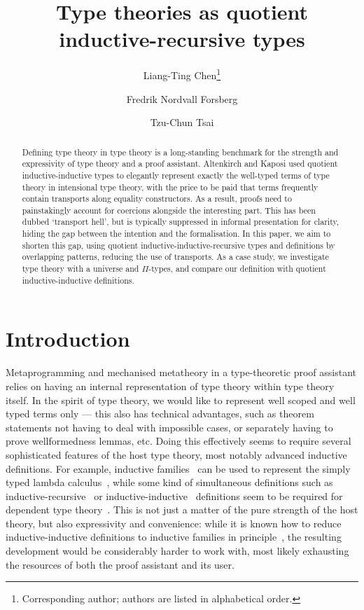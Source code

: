 \documentclass[a4paper,UKenglish,numberwithinsect,cleveref,thm-restate]{lipics-v2021}
\title{Type theories as quotient inductive-recursive types}
\author{Liang-Ting Chen\footnote{Corresponding author; authors are listed in alphabetical order.}}{Institute of Information Science, Academia Sinica, Taiwan \and \url{http://l-tchen.github.io}}{ltchen@iis.sinica.edu.tw}{https://orcid.org/0000-0002-3250-1331}{Supported by the National Science and Technology Council of Taiwan under grant NSTC 114-2222-E-001-001-MY3.}
\author{Fredrik Nordvall Forsberg}{Department of Computer and Information Sciences, University of Strathclyde, UK \and \url{https://fredriknf.com}}{fredrik.nordvall-forsberg@strath.ac.uk}{https://orcid.org/0000-0001-6157-9288}{Supported by the Engineering and Physical Sciences Research Council [EP/Y000455/1].}
\author{Tzu-Chun Tsai}{Institute of Information Science, Academia Sinica, Taiwan}{gene0905@icloud.com}{}{Supported by the National Science and Technology Council of Taiwan under grant NSTC 112-2221-E-001-003-MY3.}
\begin{document}
\maketitle

\begin{abstract}
  Defining type theory in type theory is a long-standing benchmark for the strength and expressivity of type theory and a proof assistant.
  Altenkirch and Kaposi used quotient inductive-inductive types to elegantly represent exactly the well-typed terms of type theory in intensional type theory, with the price to be paid that terms frequently contain transports along equality constructors.
  As a result, proofs need to painstakingly account for coercions alongside the interesting part.
  This %
  has been dubbed `transport hell', but is typically suppressed in informal presentation for clarity, hiding the gap between the intention and the formalisation.
  In this paper, we aim to shorten this gap, using quotient inductive-inductive-recursive types and definitions by overlapping patterns, reducing the use of transports.
  As a case study, we investigate type theory with a universe and $\Pi$-types, and compare our definition with quotient inductive-inductive definitions.
\end{abstract}

\section{Introduction} \label{sec:intro}

Metaprogramming and mechanised metatheory in a type-theoretic proof assistant relies on having an internal representation of type theory within type theory itself.
%
In the spirit of type theory, we would like to represent well scoped and well typed terms only --- this also has technical advantages, such as theorem statements not having to deal with impossible cases, or separately having to prove wellformedness lemmas, etc.
%
Doing this effectively seems to require several sophisticated features of the host type theory, most notably advanced inductive definitions.
%
For example, inductive families~\cite{Dybjer1994} can be used to represent the simply typed lambda calculus~\cite{Altenkirch1999}, while some kind of simultaneous definitions such as inductive-recursive~\cite{Dybjer2000} or inductive-inductive~\cite{Nordvall-Forsberg2014} definitions seem to be required for dependent type theory~\cite{Danielsson2006,Chapman2009}.
%
This is not just a matter of the pure strength of the host theory, but also expressivity and convenience: while it is known how to reduce inductive-inductive definitions to inductive families in principle~\cite{Kaposi2020a}, the resulting development would be considerably harder to work with, most likely exhausting the resources of both the proof assistant and its user.
\end{document}
